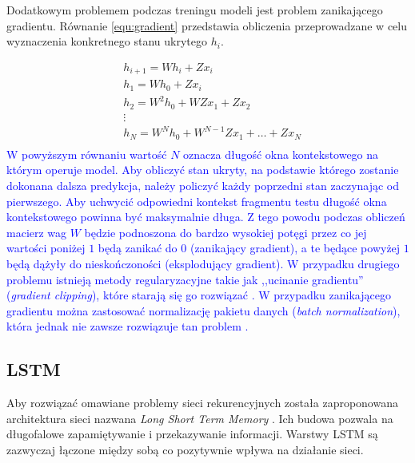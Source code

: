 \documentclass[data-science]{agh-wi} %
\begin{document}
Dodatkowym problemem podczas treningu modeli jest problem zanikającego gradientu. Równanie \ref*{equ:gradient} przedstawia obliczenia przeprowadzane w celu wyznaczenia konkretnego stanu ukrytego $h_i$.

\begin{equation} %
    \begin{aligned}
         & h_{i+1}=Wh_i+Zx_i  \\
         & h_1=Wh_0+Zx_i  \\
         & h_2=W^2h_0+WZx_1+Zx_2 \\
         & \vdots \\
         & h_N = W^Nh_0+W^{N-1}Zx_1 +\dots + Zx_N\\
    \end{aligned}
    \label{equ:gradient}
\end{equation}
\textcolor{blue}{W powyższym równaniu wartość $N$ oznacza długość okna kontekstowego na którym operuje model. Aby obliczyć stan ukryty, na podstawie którego zostanie dokonana dalsza predykcja, należy policzyć każdy poprzedni stan zaczynając od pierwszego. Aby uchwycić odpowiedni kontekst fragmentu testu długość okna kontekstowego powinna być maksymalnie długa. Z tego powodu podczas obliczeń macierz wag $W$ będzie podnoszona do bardzo wysokiej potęgi przez co jej wartości poniżej $1$ będą zanikać do $0$ (zanikający gradient), a te będące powyżej $1$ będą dążyły do nieskończoności (eksplodujący gradient). W przypadku drugiego problemu istnieją metody regularyzacyjne takie jak ,,ucinanie gradientu'' (\textit{gradient clipping}), które starają się go rozwiązać \cite*{deeplearning_book}. W przypadku zanikającego gradientu można zastosować normalizację pakietu danych (\textit{batch normalization}), która jednak nie zawsze rozwiązuje tan problem \cite*{batch_norm}.}

\subsection{LSTM}
Aby rozwiązać omawiane problemy sieci rekurencyjnych została zaproponowana architektura sieci nazwana \textit{Long Short Term Memory} \cite{lstm_og}. Ich budowa pozwala na długofalowe zapamiętywanie i przekazywanie informacji. Warstwy LSTM są zazwyczaj łączone między sobą co pozytywnie wpływa na działanie sieci.
\end{document}
